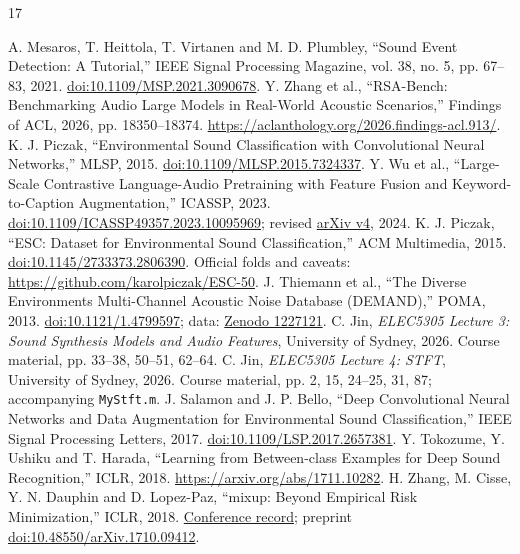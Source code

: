 \documentclass[a4paper,10pt]{article}
\begin{document}
\begin{thebibliography}{17}\raggedright
{} A. Mesaros, T. Heittola, T. Virtanen and M. D. Plumbley, ``Sound Event Detection: A Tutorial,'' IEEE Signal Processing Magazine, vol. 38, no. 5, pp. 67--83, 2021. \href{https://doi.org/10.1109/MSP.2021.3090678}{doi:10.1109/MSP.2021.3090678}.
 Y. Zhang et al., ``RSA-Bench: Benchmarking Audio Large Models in Real-World Acoustic Scenarios,'' Findings of ACL, 2026, pp. 18350--18374. \url{https://aclanthology.org/2026.findings-acl.913/}.
 K. J. Piczak, ``Environmental Sound Classification with Convolutional Neural Networks,'' MLSP, 2015. \href{https://doi.org/10.1109/MLSP.2015.7324337}{doi:10.1109/MLSP.2015.7324337}.
 Y. Wu et al., ``Large-Scale Contrastive Language-Audio Pretraining with Feature Fusion and Keyword-to-Caption Augmentation,'' ICASSP, 2023. \href{https://doi.org/10.1109/ICASSP49357.2023.10095969}{doi:10.1109/ICASSP49357.2023.10095969}; revised \href{https://arxiv.org/abs/2211.06687v4}{arXiv v4}, 2024.
 K. J. Piczak, ``ESC: Dataset for Environmental Sound Classification,'' ACM Multimedia, 2015. \href{https://doi.org/10.1145/2733373.2806390}{doi:10.1145/2733373.2806390}. Official folds and caveats: \url{https://github.com/karolpiczak/ESC-50}.
 J. Thiemann et al., ``The Diverse Environments Multi-Channel Acoustic Noise Database (DEMAND),'' POMA, 2013. \href{https://doi.org/10.1121/1.4799597}{doi:10.1121/1.4799597}; data: \href{https://doi.org/10.5281/zenodo.1227121}{Zenodo 1227121}.
 C. Jin, \emph{ELEC5305 Lecture 3: Sound Synthesis Models and Audio Features}, University of Sydney, 2026. Course material, pp. 33--38, 50--51, 62--64.
 C. Jin, \emph{ELEC5305 Lecture 4: STFT}, University of Sydney, 2026. Course material, pp. 2, 15, 24--25, 31, 87; accompanying \texttt{MyStft.m}.
 J. Salamon and J. P. Bello, ``Deep Convolutional Neural Networks and Data Augmentation for Environmental Sound Classification,'' IEEE Signal Processing Letters, 2017. \href{https://doi.org/10.1109/LSP.2017.2657381}{doi:10.1109/LSP.2017.2657381}.
 Y. Tokozume, Y. Ushiku and T. Harada, ``Learning from Between-class Examples for Deep Sound Recognition,'' ICLR, 2018. \url{https://arxiv.org/abs/1711.10282}.
 H. Zhang, M. Cisse, Y. N. Dauphin and D. Lopez-Paz, ``mixup: Beyond Empirical Risk Minimization,'' ICLR, 2018. \href{https://openreview.net/forum?id=r1Ddp1-Rb}{Conference record}; preprint \href{https://doi.org/10.48550/arXiv.1710.09412}{doi:10.48550/arXiv.1710.09412}.

\end{thebibliography}
\end{document}
